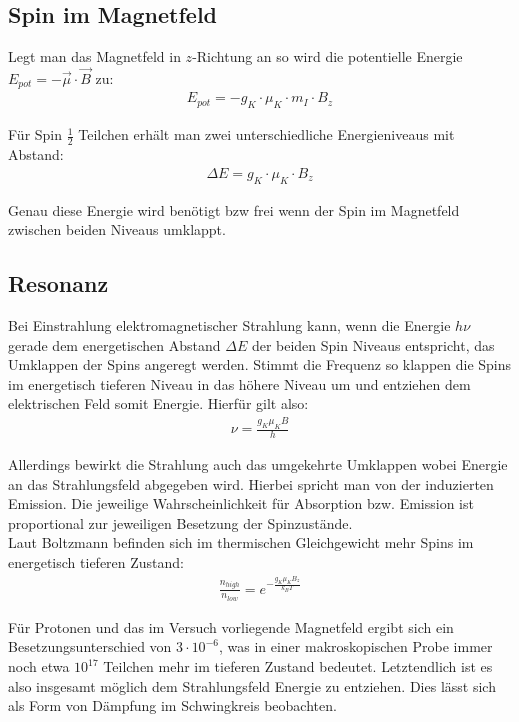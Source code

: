 \documentclass[12pt]{article}
\begin{document}
\subsection{Spin im Magnetfeld}
Legt man das Magnetfeld in $z$-Richtung an so wird die potentielle Energie $E_{pot} = -\vec\mu \cdot \vec B$ zu:
\begin{align}
 E_{pot} = -g_K \cdot \mu_K \cdot m_I \cdot B_z
\end{align}

Für Spin $\frac{1}{2}$ Teilchen erhält man zwei unterschiedliche Energieniveaus mit Abstand:
\begin{align}
 \Delta E = g_K \cdot \mu_K \cdot B_z
\end{align}

Genau diese Energie wird benötigt bzw frei wenn der Spin im Magnetfeld zwischen beiden Niveaus umklappt.

\subsection{Resonanz}
Bei Einstrahlung elektromagnetischer Strahlung kann, wenn die Energie $h\nu$ gerade dem energetischen Abstand $\Delta E$ der beiden Spin Niveaus entspricht, das Umklappen der Spins angeregt werden. Stimmt die Frequenz so klappen die Spins im energetisch tieferen Niveau in das höhere Niveau um und entziehen dem elektrischen Feld somit Energie. Hierfür gilt also:
\begin{align}
 \nu = \frac{g_K \mu_K B}{h}
\label{resfreq}
\end{align}


 Allerdings bewirkt die Strahlung auch das umgekehrte Umklappen wobei Energie an das Strahlungsfeld abgegeben wird. Hierbei spricht man von der induzierten Emission. Die jeweilige Wahrscheinlichkeit für Absorption bzw. Emission ist proportional zur jeweiligen Besetzung der Spinzustände.\\

Laut Boltzmann befinden sich im thermischen Gleichgewicht mehr Spins im energetisch tieferen Zustand:
\begin{align}
 \frac{n_{high}}{n_{low}} = e^{-\frac{g_K \mu_K B_z}{k_B T}} 
\end{align}

Für Protonen und das im Versuch vorliegende Magnetfeld ergibt sich ein Besetzungsunterschied von $3\cdot 10^{-6}$, was in einer makroskopischen Probe immer noch etwa $10^{17}$ Teilchen mehr im tieferen Zustand bedeutet. Letztendlich ist es also insgesamt möglich dem Strahlungsfeld Energie zu entziehen. Dies lässt sich als Form von Dämpfung im Schwingkreis beobachten.
\end{document}
